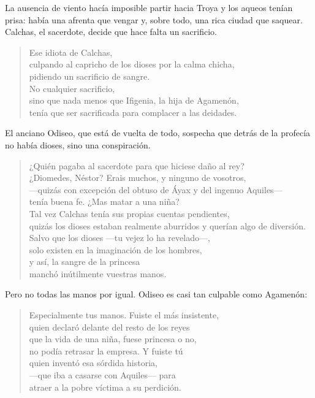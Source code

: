La ausencia de viento hacía imposible partir hacia Troya y los aqueos tenían prisa: había una afrenta que vengar y, sobre todo, una rica ciudad que saquear. Calchas, el sacerdote, decide que hace falta un sacrificio.

\begin{verse}
Ese idiota de Calchas,\\
culpando al capricho de los dioses por la calma chicha,\\
pidiendo un sacrificio de sangre.\\
No cualquier sacrificio,\\
sino que nada menos que Ifigenia, la hija de Agamenón,\\
tenía que ser sacrificada para complacer a las deidades.
\end{verse}

El anciano Odiseo, que está de vuelta de todo, sospecha que detrás de la profecía no había dioses, sino una conspiración.

\begin{verse}
¿Quién pagaba al sacerdote para que hiciese daño al rey?\\
¿Diomedes, Néstor? Erais muchos, y ninguno de vosotros,\\
---quizás con excepción del obtuso de Áyax y del ingenuo Aquiles---\\
tenía buena fe. ¿Mas matar a una niña?\\
Tal vez Calchas tenía sus propias cuentas pendientes,\\
quizás los dioses estaban realmente aburridos y querían algo de diversión.\\
Salvo que los dioses ---tu vejez lo ha revelado---,\\
solo existen en la imaginación de los hombres,\\
y así, la sangre de la princesa\\
manchó inútilmente vuestras manos.
\end{verse}

Pero no todas las manos por igual. Odiseo es casi tan culpable como Agamenón:

\begin{verse}
Especialmente tus manos. Fuiste el más insistente,\\
quien declaró delante del resto de los reyes\\
que la vida de una niña, fuese princesa o no,\\
no podía retrasar la empresa. Y fuiste tú\\
quien inventó esa sórdida historia,\\
---que iba a casarse con Aquiles--- para\\
atraer a la pobre víctima a su perdición.
\end{verse}

